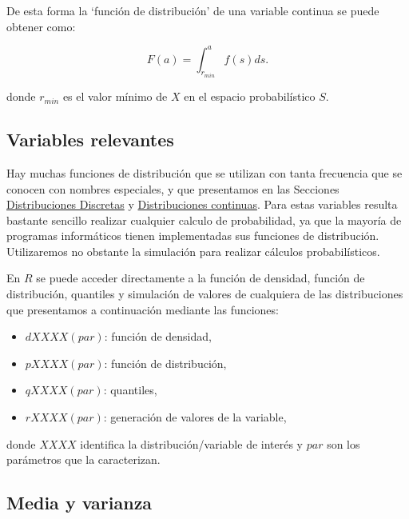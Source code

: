 \documentclass[
]{book}
\providecommand{\tightlist}{%
  \setlength{\itemsep}{0pt}\setlength{\parskip}{0pt}}
\newenvironment{silverbox}{
  \definecolor{shadecolor}{rgb}{192, 192, 192}  
  \color{black}
  \begin{shaded}}
 {\end{shaded}}
\theoremstyle{definition}
\theoremstyle{definition}
\theoremstyle{definition}
\theoremstyle{definition}
\theoremstyle{remark}
\begin{document}
De esta forma la `función de distribución' de una variable continua se puede obtener como:

\begin{equation*}
  F(a) = \int_{r_{min}}^{a} f(s)ds.
\end{equation*}

donde \(r_{min}\) es el valor mínimo de \(X\) en el espacio probabilístico \(S\).

\hypertarget{variables-relevantes}{%
\subsection{Variables relevantes}\label{variables-relevantes}}

Hay muchas funciones de distribución que se utilizan con tanta frecuencia que se conocen con nombres especiales, y que presentamos en las Secciones \protect\hyperlink{distribuciones-discretas}{Distribuciones Discretas} y \protect\hyperlink{distribuciones-continuas}{Distribuciones continuas}. Para estas variables resulta bastante sencillo realizar cualquier calculo de probabilidad, ya que la mayoría de programas informáticos tienen implementadas sus funciones de distribución. Utilizaremos no obstante la simulación para realizar cálculos probabilísticos.

\begin{silverbox}
En \(R\) se puede acceder directamente a la función de densidad, función de distribución, quantiles y simulación de valores de cualquiera de las distribuciones que presentamos a continuación mediante las funciones:

\begin{itemize}
\tightlist
\item
  \(dXXXX(par)\): función de densidad,
\item
  \(pXXXX(par)\): función de distribución,
\item
  \(qXXXX(par)\): quantiles,
\item
  \(rXXXX(par)\): generación de valores de la variable,
\end{itemize}

donde \(XXXX\) identifica la distribución/variable de interés y \(par\) son los parámetros que la caracterizan.

\end{silverbox}

\hypertarget{media-y-varianza}{%
\subsection{Media y varianza}\label{media-y-varianza}}
\end{document}
